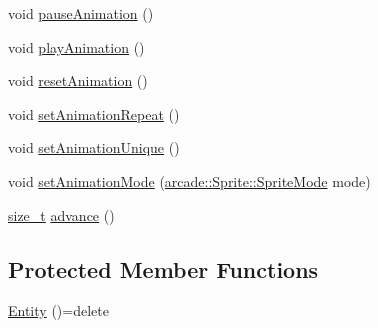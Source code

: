 \begin{DoxyCompactItemize}
\item 
void \hyperlink{classarcade_1_1_entity_a509de7e8929736e073ba2c3802969bec}{pause\-Animation} ()
\item 
void \hyperlink{classarcade_1_1_entity_a6c3e46bbc37f68fb91ef0ac460a32a36}{play\-Animation} ()
\item 
void \hyperlink{classarcade_1_1_entity_ac8edc7223abe24f75c175f7a867f9ff7}{reset\-Animation} ()
\item 
void \hyperlink{classarcade_1_1_entity_ae0ee5f40f6125a8d188f53d7c7ad0180}{set\-Animation\-Repeat} ()
\item 
void \hyperlink{classarcade_1_1_entity_ada9c9fb4e1924a5b04945988d2c07f50}{set\-Animation\-Unique} ()
\item 
void \hyperlink{classarcade_1_1_entity_a2d30e5792fd9639cb312d206723b131a}{set\-Animation\-Mode} (\hyperlink{classarcade_1_1_sprite_a897686598b8b81a1c7b329b5621f8146}{arcade\-::\-Sprite\-::\-Sprite\-Mode} mode)
\item 
\hyperlink{nc__alloc_8h_a7b60c5629e55e8ec87a4547dd4abced4}{size\-\_\-t} \hyperlink{classarcade_1_1_entity_a1c3b256aa8b5466d177a94722cd06e32}{advance} ()
\end{DoxyCompactItemize}
\subsection*{Protected Member Functions}
\begin{DoxyCompactItemize}
\item 
\hyperlink{classarcade_1_1_entity_a56d9f9927d75b980594c7c4ee56f2f68}{Entity} ()=delete
\end{DoxyCompactItemize}
